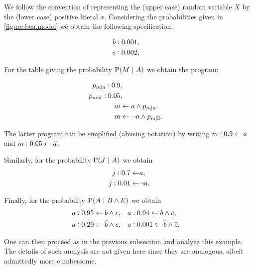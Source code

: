\documentclass{article}
\begin{document}
We follow the convention of representing the (upper case) random
variable \(X\) by the (lower case) positive literal \(x\).
%
Considering the probabilities given in \cref{figure:bea.model} we obtain
the following specification:

\begin{equation*}
	\begin{aligned}
		b:0.001 & ,\cr e:0.002 & ,\cr \end{aligned}
	\label{eq:not_so_simple_example}
\end{equation*}

For the table giving the probability \(\pr{M \given A}\) we obtain the
program:

\begin{equation*}
	\begin{aligned}
		p_{m|a}:0.9 & ,\cr p_{m|\overline{a}}:0.05 & ,\cr m & \leftarrow a \wedge p_{m|a},\cr m & \leftarrow \neg a \wedge p_{m|\overline{a}}.
	\end{aligned}
\end{equation*}

The latter program can be simplified (abusing notation) by writing
\(m:0.9 \leftarrow a\) and \(m:0.05 \leftarrow \overline{a}\).

Similarly, for the probability \(\pr{J \given A}\) we obtain
\begin{equation*}
	\begin{aligned}
		j:0.7 \leftarrow   & a,      \\
		j:0.01 \leftarrow  & \neg a,
	\end{aligned}
\end{equation*}

Finally, for the probability \(\pr{A \given B \wedge E}\) we obtain
\begin{equation*}
	\begin{aligned}
		a:0.95 \leftarrow b \wedge e,                                              &  &  &
		a:0.94 \leftarrow b \wedge \overline{e},\cr a:0.29 \leftarrow \overline{b} \wedge e, &  &  &
		a:0.001 \leftarrow \overline{b} \wedge \overline{e}.
	\end{aligned}\label{eq:prA.given.B.and.E}
\end{equation*}

One can then proceed as in the previous subsection and analyze this
example.  The details of such analysis are not given here since they
are analogous, albeit admittedly more cumbersome.



\end{document}
